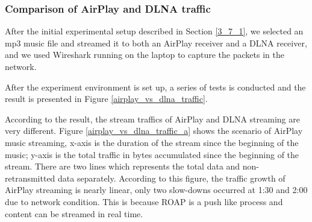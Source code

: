 \subsubsection{Comparison of AirPlay and DLNA traffic\label{4_1_1}}
After the initial experimental setup described in Section \ref{3_7_1}, we
selected an mp3 music file and streamed it to both an AirPlay receiver
and a DLNA receiver, and we used Wireshark running on the laptop to capture the
packets in the network.

After the experiment environment is set up, a series of tests is conducted and
the result is presented in Figure \ref{airplay_vs_dlna_traffic}.

According to the result, the stream traffics of AirPlay and DLNA streaming are
very different. Figure \ref{airplay_vs_dlna_traffic_a} shows the scenario of
AirPlay music streaming, x-axis is the duration of the stream since the
beginning of the music; y-axis is the total traffic in bytes accumulated since
the beginning of the stream. There are two lines which represents the total
data and non-retransmitted data separately. According to this figure, the
traffic growth of AirPlay streaming is nearly linear, only two slow-downs
occurred at 1:30 and 2:00 due to network condition. This is because ROAP is a
push like process and content can be streamed in real time.

